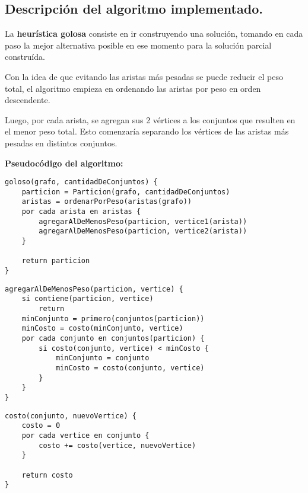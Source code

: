 \subsection{Descripción del algoritmo implementado.}
\vspace*{0.3cm}

La \textbf{heurística golosa} consiste en ir construyendo una solución,
tomando en cada paso la mejor alternativa posible en ese momento para la
solución parcial construída.

Con la idea de que evitando las aristas más pesadas se puede reducir el peso
total, el algoritmo empieza en ordenando las aristas por peso en orden
descendente.

Luego, por cada arista, se agregan sus 2 vértices a los conjuntos que resulten en el menor peso total. Esto comenzaría separando los vértices
de las aristas más pesadas en distintos conjuntos.

\vspace*{0.5cm}

\textbf{Pseudocódigo del algoritmo:}

\vspace*{0.3cm}

\begin{verbatim}
goloso(grafo, cantidadDeConjuntos) {
    particion = Particion(grafo, cantidadDeConjuntos)
    aristas = ordenarPorPeso(aristas(grafo))
    por cada arista en aristas {
        agregarAlDeMenosPeso(particion, vertice1(arista))
        agregarAlDeMenosPeso(particion, vertice2(arista))
    }

    return particion
}
\end{verbatim}

\vspace*{0.3cm}

\begin{verbatim}
agregarAlDeMenosPeso(particion, vertice) {
    si contiene(particion, vertice)
        return
    minConjunto = primero(conjuntos(particion))
    minCosto = costo(minConjunto, vertice)
    por cada conjunto en conjuntos(particion) {
        si costo(conjunto, vertice) < minCosto {
            minConjunto = conjunto
            minCosto = costo(conjunto, vertice)
        }
    }
}
\end{verbatim}

\vspace*{0.3cm}

\begin{verbatim}
costo(conjunto, nuevoVertice) {
    costo = 0
    por cada vertice en conjunto {
        costo += costo(vertice, nuevoVertice)
    }

    return costo
}
\end{verbatim}


